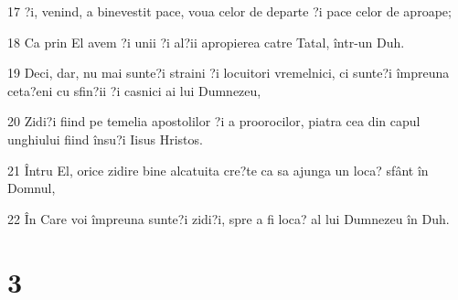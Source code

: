 \par 17 ?i, venind, a binevestit pace, voua celor de departe ?i pace celor de aproape;
\par 18 Ca prin El avem ?i unii ?i al?ii apropierea catre Tatal, într-un Duh.
\par 19 Deci, dar, nu mai sunte?i straini ?i locuitori vremelnici, ci sunte?i împreuna ceta?eni cu sfin?ii ?i casnici ai lui Dumnezeu,
\par 20 Zidi?i fiind pe temelia apostolilor ?i a proorocilor, piatra cea din capul unghiului fiind însu?i Iisus Hristos.
\par 21 Întru El, orice zidire bine alcatuita cre?te ca sa ajunga un loca? sfânt în Domnul,
\par 22 În Care voi împreuna sunte?i zidi?i, spre a fi loca? al lui Dumnezeu în Duh.

\chapter{3}

